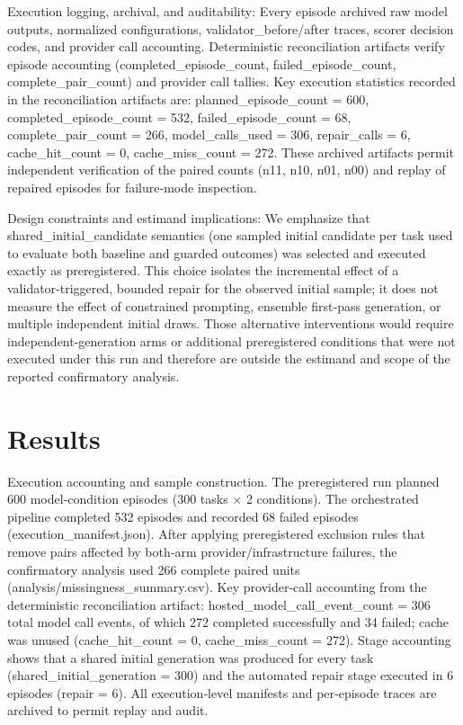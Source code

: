 \documentclass[conference]{IEEEtran}
\begin{document}
Execution logging, archival, and auditability: Every episode archived raw model outputs, normalized configurations, validator\_before/after traces, scorer decision codes, and provider call accounting. Deterministic reconciliation artifacts verify episode accounting (completed\_episode\_count, failed\_episode\_count, complete\_pair\_count) and provider call tallies. Key execution statistics recorded in the reconciliation artifacts are: planned\_episode\_count = 600, completed\_episode\_count = 532, failed\_episode\_count = 68, complete\_pair\_count = 266, model\_calls\_used = 306, repair\_calls = 6, cache\_hit\_count = 0, cache\_miss\_count = 272. These archived artifacts permit independent verification of the paired counts (n11, n10, n01, n00) and replay of repaired episodes for failure‑mode inspection.

Design constraints and estimand implications: We emphasize that shared\_initial\_candidate semantics (one sampled initial candidate per task used to evaluate both baseline and guarded outcomes) was selected and executed exactly as preregistered. This choice isolates the incremental effect of a validator‑triggered, bounded repair for the observed initial sample; it does not measure the effect of constrained prompting, ensemble first‑pass generation, or multiple independent initial draws. Those alternative interventions would require independent-generation arms or additional preregistered conditions that were not executed under this run and therefore are outside the estimand and scope of the reported confirmatory analysis.

\section{Results}
Execution accounting and sample construction. The preregistered run planned 600 model‑condition episodes (300 tasks \ensuremath{\times} 2 conditions). The orchestrated pipeline completed 532 episodes and recorded 68 failed episodes (execution\_manifest.json). After applying preregistered exclusion rules that remove pairs affected by both‑arm provider/infrastructure failures, the confirmatory analysis used 266 complete paired units (analysis/missingness\_summary.csv). Key provider‑call accounting from the deterministic reconciliation artifact: hosted\_model\_call\_event\_count = 306 total model call events, of which 272 completed successfully and 34 failed; cache was unused (cache\_hit\_count = 0, cache\_miss\_count = 272). Stage accounting shows that a shared initial generation was produced for every task (shared\_initial\_generation = 300) and the automated repair stage executed in 6 episodes (repair = 6). All execution‑level manifests and per‑episode traces are archived to permit replay and audit.
\end{document}
